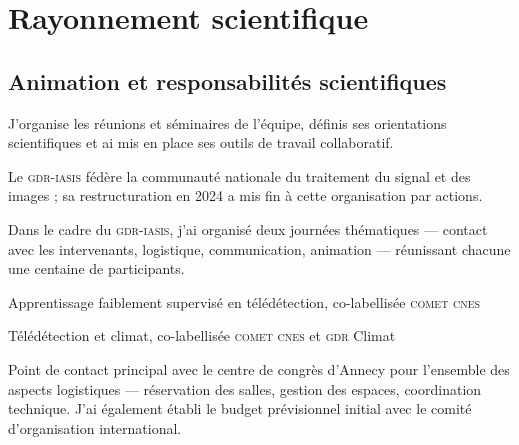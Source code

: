 \section{Rayonnement scientifique}
\label{sec:cv-rayonnement}

\subsection{Animation et responsabilités scientifiques}
\label{subsec:cv-animation}

J'organise les réunions et séminaires de l'équipe, définis ses orientations
scientifiques et ai mis en place ses outils de travail collaboratif.

Le \textsc{gdr-iasis} fédère la communauté nationale du traitement du signal et
des images ; sa restructuration en 2024 a mis fin à cette organisation par
actions.


Dans le cadre du \textsc{gdr-iasis}, j'ai organisé deux journées thématiques
--- contact avec les intervenants, logistique, communication, animation ---
réunissant chacune une centaine de participants.

\begin{cvfields}
  \item[Janvier 2023] Apprentissage faiblement supervisé en télédétection,
    co-labellisée \textsc{comet cnes}
  \item[Décembre 2024] Télédétection et climat, co-labellisée \textsc{comet
    cnes} et \textsc{gdr} Climat
\end{cvfields}


Point de contact principal avec le centre de congrès d'Annecy pour l'ensemble
des aspects logistiques --- réservation des salles, gestion des espaces,
coordination technique. J'ai également établi le budget prévisionnel initial
avec le comité d'organisation international.

